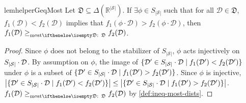 \documentclass{article}
\renewcommand{\abs}[1]{\left|#1\right|}
\newcommand*{\prn}[1]{\left(#1\right)}
\newcommand*{\reals}{\mathbb{R}}
\newcommand*{\St}{\mathcal{S}}
\newcommand*{\rewardVS}{\reals^{\abs{\St}}} %
\newcommand*{\D}{\mathcal{D}} %
\newcommand*{\distSet}{\mathfrak{D}}
\newcommand*{\mdpPermGroup}{S_{\abs{\St}}}
\theoremstyle{definition}
\begin{document}
\begin{appendices}
\ineqMost*

\begin{restatable}{lem}{helperGeqMost}\label{lem:helper-geq-most}
Let $\distSet\subseteq \Delta(\rewardVS)$. If $\exists \phi\in\mdpPermGroup$ such that for all $\D\in\distSet$, $f_1\prn{\D}< f_2\prn{\D}$ implies that $f_1\prn{\phi\cdot \D}> f_2\prn{\phi\cdot \D}$, then $f_1(\D) \geqMost[][\distSet] f_2(\D)$.
\end{restatable}
\begin{proof}
Since $\phi$ does not belong to the stabilizer of $\mdpPermGroup$, $\phi$ acts injectively on $\orbi[\D]$. By assumption on $\phi$, the image of $\{\D'\in\orbi[\D]\mid f_1(\D')<f_2(\D')\}$ under $\phi$ is a subset of $\{\D'\in\orbi[\D]\mid f_1(\D')>f_2(\D')\}$. Since $\phi$ is injective, $\abs{\{\D'\in\orbi[\D]\mid f_1(\D')<f_2(\D')\}}\leq \abs{\{\D'\in\orbi[\D]\mid f_1(\D')>f_2(\D')\}}$. $f_1(\D) \geqMost[][\distSet] f_2(\D)$ by \cref{def:ineq-most-dists}.
\end{proof}


\end{appendices}
\end{document}
